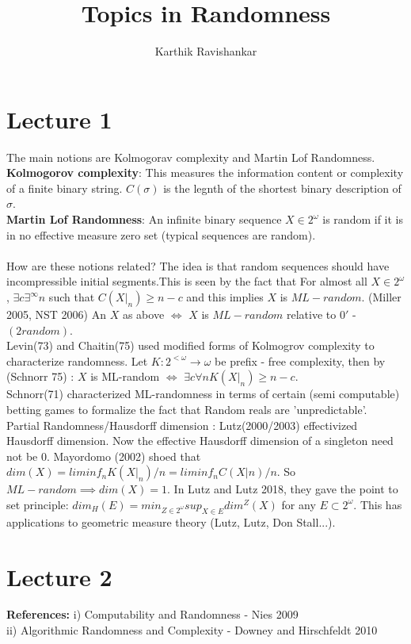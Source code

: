 \documentclass{article}
\title{Topics in Randomness}
\author{Karthik Ravishankar}
\begin{document}
	\maketitle
	\section{Lecture 1}
	The main notions are Kolmogorav complexity and Martin Lof Randomness.\\
	\textbf{Kolmogorov complexity}: This measures the information content or complexity of a finite binary string. $C(\sigma)$ is the legnth of the shortest binary description of $\sigma$. \\
	\textbf{Martin Lof Randomness}: An infinite binary sequence $X \in 2^\omega$ is random if it is in no effective measure zero set (typical sequences are random).\\
	\\
	How are these notions related? The idea is that random sequences should have incompressible initial segments.This is seen by the fact that For almost all $X \in 2^\omega$, $\exists c \exists^\infty n$ such that $C(X|_n) \geq n-c$ and this implies $X$ is $ML-random$. (Miller 2005, NST 2006) An $X$ as above $\iff$ $X$ is $ML-random$ relative to $0'$ - $(2 random)$.\\
	Levin(73) and Chaitin(75) used modified forms of Kolmogrov complexity to characterize randomness. Let $K: 2^{<\omega} \to \omega$ be prefix - free complexity, then by (Schnorr 75) : $X$ is ML-random $\iff$ $\exists c \forall n K(X|_n) \geq n-c$.\\
	Schnorr(71) characterized ML-randomness in terms of certain (semi computable) betting games to formalize the fact that Random reals are 'unpredictable'.\\
	Partial Randomness/Hausdorff dimension : Lutz(2000/2003) effectivized Hausdorff dimension. Now the effective Hausdorff dimension of a singleton need not be $0$. Mayordomo (2002) shoed that $dim(X) = liminf_n K(X|_n)/n = liminf_n C(X|n)/n$. So $ML - random \implies dim(X) =1$. In Lutz and Lutz 2018, they gave the point to set principle: $dim_H(E) = min_{Z \in 2^\omega} sup_{X\in E} dim^Z(X) $ for any $E \subset 2^\omega$. This has applications to geometric measure theory (Lutz, Lutz, Don Stall...).\\ \newpage
	\section{Lecture 2}
	\textbf{References:} i) Computability and Randomness - Nies 2009\\
	ii) Algorithmic Randomness and Complexity - Downey and Hirschfeldt 2010\\
\end{document}
